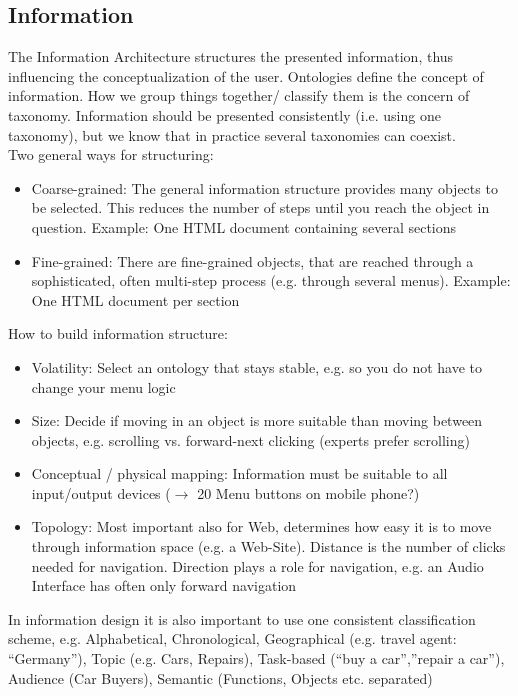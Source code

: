 \subsection{Information}
The Information Architecture structures the presented information, thus influencing the conceptualization of the user. Ontologies define the concept of information. How we group things together/ classify them is the concern of taxonomy. Information should be presented consistently (i.e. using one taxonomy), but we know that in practice several taxonomies can coexist.\\
Two general ways for structuring:
\begin{itemize}
\item Coarse-grained: The general information structure provides many objects to be selected. This reduces the number of steps until you reach the object in question. Example: One HTML document containing several sections
\item Fine-grained: There are fine-grained objects, that are reached through a sophisticated, often multi-step process (e.g. through several menus). Example: One HTML document per section
\end{itemize}
How to build information structure: 
\begin{itemize}
\item Volatility: Select an ontology that stays stable, e.g. so you do not have to change your menu logic
\item Size: Decide if moving in an object is more suitable than moving between objects, e.g. scrolling vs. forward-next clicking (experts prefer scrolling)
\item Conceptual / physical mapping: Information must be suitable to all input/output devices ($\rightarrow$ 20 Menu buttons on mobile phone?)
\item Topology: Most important also for Web, determines how easy it is to move through information space (e.g. a Web-Site). Distance is the number of clicks needed for navigation. Direction plays a role for navigation, e.g. an Audio Interface has often only forward navigation
\end{itemize}
In information design it is also important to use one consistent classification scheme, e.g. Alphabetical, Chronological, Geographical (e.g. travel agent: ``Germany''), Topic (e.g. Cars, Repairs), Task-based (``buy a car'',''repair a car''), Audience (Car Buyers), Semantic (Functions, Objects etc. separated)

